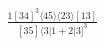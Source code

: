 \documentclass[varwidth, border=5pt]{standalone}
\begin{document}
\begin{my}
$\begin{gathered}
\scriptscriptstyle\frac{1[34]^3⟨45⟩⟨23⟩[13]}{[35]⟨3|1+2|3]^3}
\end{gathered}$
\end{my}
\end{document}
